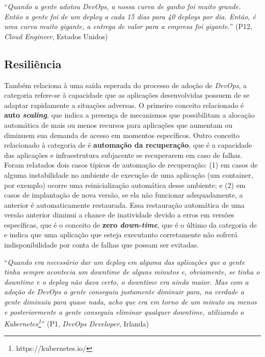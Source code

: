\begin{mq}
``\emph{Quando a gente adotou DevOps, a nossa curva de ganho foi muito grande.
Então a gente foi de um deploy a cada 15 dias para 40 deploys por dia. Então,
é uma curva muito gigante, a entrega de valor para a empresa foi gigante.}''
(P12, {\it Cloud Engineer}, Estados Unidos)
\end{mq}

\subsection{Resiliência}

Também relaciona à uma saída esperada do processo de adoção de {\it DevOps}, a
categoria  refere-se à capacidade que as aplicações
desenvolvidas possuem de se adaptar rapidamente a situações adversas. O primeiro
conceito relacionado é {\bf auto \emph{scaling}}, que indica a presença de
mecanismos que possibilitam a alocação automática de mais ou menos recursos para
aplicações que aumentam ou diminuem sua demanda de acesso em momentos
específicos. Outro conceito relacionado à categoria de  é
\textbf{automação da recuperação}, que é a capacidade das aplicações e
infraestrutura subjacente se recuperarem em caso de falhas. Foram relatados dois
casos típicos de automação de recuperação: (1) em casos de alguma instabilidade
no ambiente de execução de uma aplicação (um container, por exemplo) ocorre
uma reinicialização automática desse ambiente; e (2) em casos de implantação
de nova versão, se ela não funcionar adequadamente, a anterior é automaticamente
restaurada. Essa restauração automática de uma versão anterior diminui a chance
de inatividade devido a erros em versões específicas, que é o conceito de {\bf
zero \emph{down-time}}, que é o último da categoria de  e indica
que uma aplicação que esteja executanto corretamente não sofrerá
indisponibilidade por conta de falhas que possam ser evitadas.

\begin{mq}
``\emph{Quando era necessário dar um deploy em alguma das aplicações que a
gente tinha sempre acontecia um downtime de alguns minutos e, obviamente, se
tinha o downtime e o deploy não dava certo, o downtime era ainda maior. Mas com
a adoção de DevOps a gente conseguiu justamente diminuir para, na verdade a
gente diminuiu para quase nada, acho que era em torno de um minuto ou menos e
posteriormente a gente conseguiu eliminar qualquer downtime, utilizando o
Kubernetes\footnote{https://kubernetes.io/}}''
(P1, {\it DevOps Developer}, Irlanda)
\end{mq}

